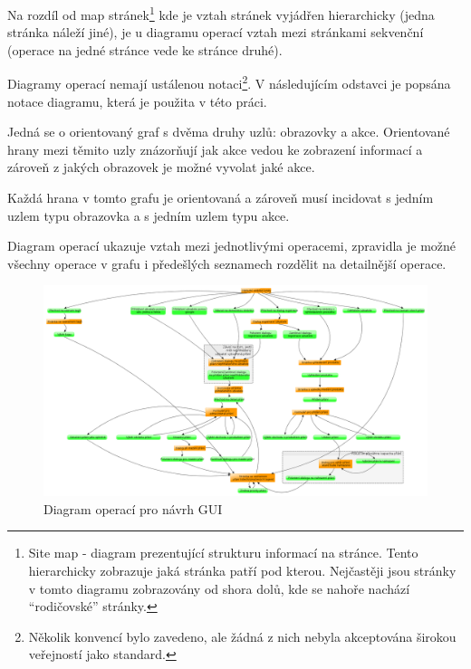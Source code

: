 Na rozdíl od map stránek\footnote{Site map - diagram prezentující strukturu informací na stránce. Tento hierarchicky zobrazuje jaká stránka patří pod kterou. Nejčastěji jsou stránky v tomto diagramu zobrazovány od shora dolů, kde se nahoře nachází ``rodičovské'' stránky\cite{brown2007communicating}.} kde je vztah stránek vyjádřen hierarchicky (jedna stránka náleží jiné), je u diagramu operací vztah mezi stránkami sekvenční (operace na jedné stránce vede ke stránce druhé)\cite{brown2007communicating}.

Diagramy operací nemají ustálenou notaci\footnote{Několik konvencí bylo zavedeno, ale žádná z nich nebyla akceptována širokou veřejností jako standard\cite{brown2007communicating}.}. V následujícím odstavci je popsána notace diagramu, která je použita v této práci.  

Jedná se o orientovaný graf s dvěma druhy uzlů: obrazovky a akce. Orientované hrany mezi těmito uzly znázorňují jak akce vedou ke zobrazení informací a zároveň z jakých obrazovek je možné vyvolat jaké akce.

Každá hrana v tomto grafu je orientovaná a zároveň musí incidovat s jedním uzlem typu obrazovka a s jedním uzlem typu akce.

Diagram operací ukazuje vztah mezi jednotlivými operacemi, zpravidla je možné všechny operace v grafu i předešlých seznamech rozdělit na detailnější operace.

\begin{figure}[htb]
\begin{center}
\includegraphics[width=150mm]{./pictures/taskGraph.png}
\caption{Diagram operací pro návrh GUI}
\label{fig:taskGraph}
\end{center}
\end{figure}


